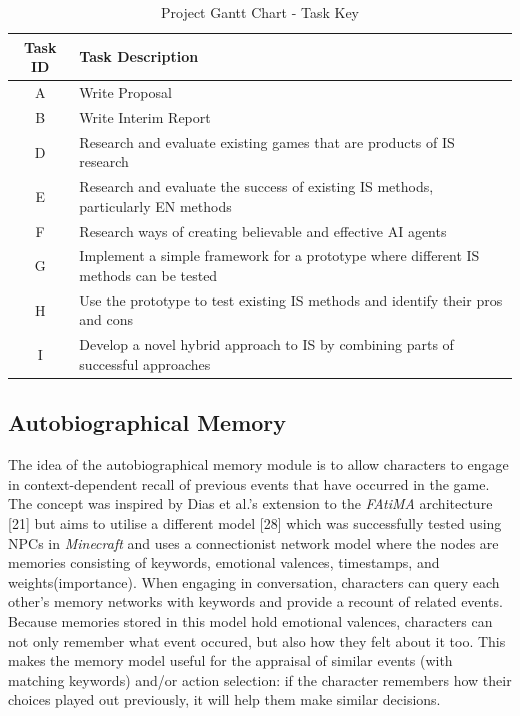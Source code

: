 \documentclass{sig-alternate-05-2015}
\begin{document}
\begin{table}[!b]
\centering
\caption{Project Gantt Chart - Task Key}
    \begin{tabular}{| c | p{13cm} |}
    \hline
    \textbf{Task ID} & \textbf{Task Description} \\ \hline
    \cellcolor{green!50}A & Write Proposal \\ \hline
    \cellcolor{green!50}B & Write Interim Report \\ \hline
    \cellcolor{green!50}D & Research and evaluate existing games that are products of IS research \\ \hline
    \cellcolor{green!50}E & Research and evaluate the success of existing IS methods, particularly EN methods \\ \hline
    \cellcolor{green!50}F & Research ways of creating believable and effective AI agents \\ \hline
    \cellcolor{orange!50}G & Implement a simple framework for a prototype where different IS methods can be tested \\ \hline
    \cellcolor{red!50}H & Use the prototype to test existing IS methods and identify their pros and cons \\ \hline
    \cellcolor{orange!50}I & Develop a novel hybrid approach to IS by combining parts of successful approaches \\ \hline
    \end{tabular}
\end{table}

\subsection{Autobiographical Memory}
\noindent The idea of the autobiographical memory module is to allow characters to engage in context-dependent recall of previous events that have occurred in the game. The concept was inspired by Dias et al.'s extension to the \textit{FAtiMA} architecture [21] but aims to utilise a different model [28] which was successfully tested using NPCs in \textit{Minecraft} and uses a  connectionist network model where the nodes are memories consisting of keywords, emotional valences, timestamps, and weights(importance). When engaging in conversation, characters can query each other's memory networks with keywords and provide a recount of related events.\\

Because memories stored in this model hold emotional valences, characters can not only remember what event occured, but also how they felt about it too. This makes the memory model useful for the appraisal of similar events (with matching keywords) and/or action selection: if the character remembers how their choices played out previously, it will help them make similar decisions.
\end{document}
